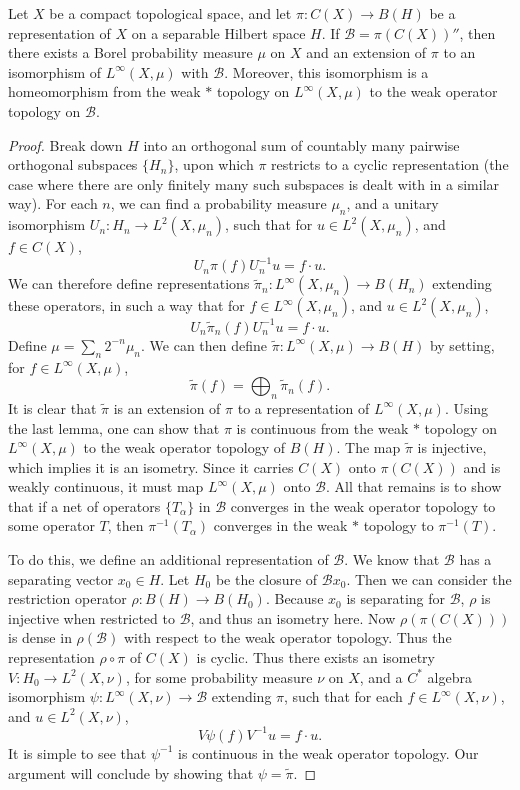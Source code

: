 \begin{theorem}
    Let $X$ be a compact topological space, and let $\pi: C(X) \to B(H)$ be a representation of $X$ on a separable Hilbert space $H$. If $\mathcal{B} = \pi(C(X))''$, then there exists a Borel probability measure $\mu$ on $X$ and an extension of $\pi$ to an isomorphism of $L^\infty(X,\mu)$ with $\mathcal{B}$. Moreover, this isomorphism is a homeomorphism from the weak $*$ topology on $L^\infty(X,\mu)$ to the weak operator topology on $\mathcal{B}$.
\end{theorem}
\begin{proof}
    Break down $H$ into an orthogonal sum of countably many pairwise orthogonal subspaces $\{ H_n \}$, upon which $\pi$ restricts to a cyclic representation (the case where there are only finitely many such subspaces is dealt with in a similar way). For each $n$, we can find a probability measure $\mu_n$, and a unitary isomorphism $U_n: H_n \to L^2(X,\mu_n)$, such that for $u \in L^2(X,\mu_n)$, and $f \in C(X)$,
    \[ U_n \pi(f) U_n^{-1} u = f \cdot u. \]
    We can therefore define representations $\tilde{\pi}_n: L^\infty(X,\mu_n) \to B(H_n)$ extending these operators, in such a way that for $f \in L^\infty(X,\mu_n)$, and $u \in L^2(X,\mu_n)$,
    \[ U_n \tilde{\pi}_n(f) U_n^{-1} u = f \cdot u. \]
    Define $\mu = \sum_n 2^{-n} \mu_n$. We can then define $\tilde{\pi}: L^\infty(X,\mu) \to B(H)$ by setting, for $f \in L^\infty(X,\mu)$,
    \[ \tilde{\pi}(f) = \bigoplus_n \tilde{\pi}_n(f). \]
    It is clear that $\tilde{\pi}$ is an extension of $\pi$ to a representation of $L^\infty(X,\mu)$. Using the last lemma, one can show that $\pi$ is continuous from the weak $*$ topology on $L^\infty(X,\mu)$ to the weak operator topology of $B(H)$. The map $\tilde{\pi}$ is injective, which implies it is an isometry. Since it carries $C(X)$ onto $\pi(C(X))$ and is weakly continuous, it must map $L^\infty(X,\mu)$ onto $\mathcal{B}$. All that remains is to show that if a net of operators $\{ T_\alpha \}$ in $\mathcal{B}$ converges in the weak operator topology to some operator $T$, then $\pi^{-1}(T_\alpha)$ converges in the weak $*$ topology to $\pi^{-1}(T)$.

    To do this, we define an additional representation of $\mathcal{B}$. We know that $\mathcal{B}$ has a separating vector $x_0 \in H$. Let $H_0$ be the closure of $\mathcal{B} x_0$. Then we can consider the restriction operator $\rho: B(H) \to B(H_0)$. Because $x_0$ is separating for $\mathcal{B}$, $\rho$ is injective when restricted to $\mathcal{B}$, and thus an isometry here. Now $\rho(\pi(C(X)))$ is dense in $\rho(\mathcal{B})$ with respect to the weak operator topology. Thus the representation $\rho \circ \pi$ of $C(X)$ is cyclic. Thus there exists an isometry $V: H_0 \to L^2(X,\nu)$, for some probability measure $\nu$ on $X$, and a $C^*$ algebra isomorphism $\psi: L^\infty(X,\nu) \to \mathcal{B}$ extending $\pi$, such that for each $f \in L^\infty(X,\nu)$, and $u \in L^2(X,\nu)$,
    \[ V\psi(f) V^{-1} u = f \cdot u. \]
    It is simple to see that $\psi^{-1}$ is continuous in the weak operator topology. Our argument will conclude by showing that $\psi = \tilde{\pi}$.


\end{proof}
